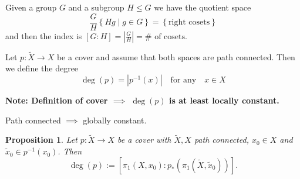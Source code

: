 \documentclass[11pt]{article}
\newcommand{\defeq}{:=}
\newcommand{\abs}[1]{|#1|}
\newcommand{\relmiddle}[1]{\mathrel{}\middle#1\mathrel{}}
\newcommand{\rmv}{\relmiddle|}
\newenvironment{defin}
	{\begin{mdframed}[backgroundcolor=white, roundcorner=5pt, linewidth=1pt]}
	{\end{mdframed}}
\newcommand{\mdf}[1]{{\color{red} #1}}
\newenvironment{note}
	{\begin{mdframed}[backgroundcolor=white, linecolor=red, roundcorner=5pt, linewidth=1pt]\bfseries{Note:}\normalfont}
	{\end{mdframed}}
\newtheorem{prop}[theorem]{Proposition}
\begin{document}
\begin{defin}
Given a group $G$ and a subgroup $H\leq G$ we have the \mdf{quotient space}
\[
	\frac{G}{H}\left\{Hg \rmv g\in G\right\} = \left\{\text{right cosets}\right\}
\]
and then the \mdf{index} is $[G:H]=\abs{\frac{G}{H}}=\#\text{ of cosets}$.

Let $p:\widetilde{X}\to X$ be a cover and assume that both spaces are path connected.
Then we define the \mdf{degree} 
\[
	\deg(p)=\abs{p^{-1}(x)} \quad\text{for any}\quad x\in X
\]
\end{defin}
\begin{note}
	Definition of cover $\implies$ $\deg(p)$ is at least locally constant.

	Path connected $\implies$ globally constant.
\end{note}
\begin{prop}
Let $p:\widetilde{X}\to X$ be a cover with $\widetilde{X}, X$ path connected, $x_0\in X$ and $\widetilde{x}_0\in p^{-1}(x_0)$.
Then \[
	\deg(p)\defeq\left[\pi_1(X, x_0) : p_\ast(\pi_1(\widetilde{X}, \widetilde{x}_0))\right].
\]
\end{prop}
\end{document}
